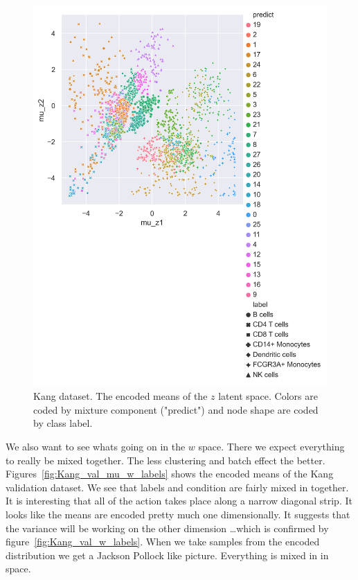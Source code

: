 \documentclass[11pt, a4paper]{report}
\theoremstyle{plain}
\theoremstyle{definition}
\theoremstyle{remark}
\begin{document}
\begin{figure}[h]
\centering
\includegraphics[width=1.10\textwidth]{images/Kang_val_mu_z_predicts_labels.png}
\caption{Kang dataset. The encoded means of the $z$ latent space.
Colors are coded by mixture component ("predict") and node shape are coded by
class label.}
\label{fig:Kang_val_mu_z_predicts_labels}
\end{figure}

We also want to see whats going on in the $w$ space. There we expect everything
to really be mixed together. The less clustering and batch effect the better.
Figures~\ref{fig:Kang_val_mu_w_labels} shows the encoded means of the Kang
validation dataset. We see that labels and condition are fairly mixed in
together. It is interesting that all of the action takes place along 
a narrow diagonal strip. It looks like the means are encoded pretty much one
dimensionally. It suggests that the variance will be working on the other
dimension \dots which is confirmed by
figure~\ref{fig:Kang_val_w_labels}. When we take samples from the encoded
distribution we get a Jackson Pollock like picture.  Everything is
mixed in in space.
\end{document}
